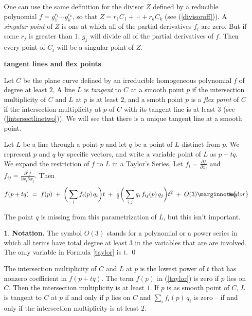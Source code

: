 \documentclass[leqno]{book}
\newcommand\Marginnote[1]{\marginnote{\hspace{-12pt}\normalfont{#1}}}
\renewcommand\theequation{\thesection.\arabic{equation}}
\newenvironment{boldequation}{\renewcommand\theequation{\textbf{\thesection.\arabic{equation}}}\equation}
   {\endequation}
\theoremstyle{definition}%
\numberwithin{equation}{section}
\newtheorem{note}[equation]{}
\theoremstyle{theorem} %
\begin{document}
\ms One can use the same definition for the divisor $Z$ defined by a
reducible polynomial $f=g_1^{r_1}\cdots g_k^{r_k}$, so that $Z=
r_1C_1+\cdots + r_kC_k$ (see (\ref{divisoroff})).  A {\it singular
  point} of $Z$ is one at which all of the partial derivatives $f_i$
are zero.  But if some $r_j$ is
greater than $1$, $g_j$ will divide all of the partial
derivatives of $f$.  Then every point of $C_j$ will be a singular
point of  $Z$.


\begin{boldequation}\Marginnote{tangent} 
\hspace{-8.5cm} \textbf{tangent lines and flex points} 
\label{tangent}\end{boldequation}


\ms Let $C$ be the plane curve defined by an irreducible homogeneous
polynomial $f$ of degree at least $2$, A line $L$ is {\it tangent} to
$C$ at a smooth point $p$ if the intersection multiplicity of $C$ and
$L$ at $p$ is at least $2$, and a smoth point
 $p$ is a {\it flex point} of
$C$ if the intersection multiplicity at $p$ of $C$ with its tangent
line is at least $3$ (see (\ref{intersectlinetwo})).  We will see that
there is a unique tangent line at a smooth point.

\ms Let $L$ be a line through a point $p$ and let $q$ be a point of
$L$ distinct from $p$.  We represent $p$ and $q$ by specific vectors,
and write a variable point of $L$ as $p+tq$.
We  expand the restriction of $f$ to $L$ in a Taylor's Series, 
Let $f_{i}= \frac {\partial f}{\partial x_i} $ and $f_{ij}=
\frac {\partial^2 f}{\partial x_i\partial x_j}$.  Then
\begin{equation}f(p+tq) \;=\; f(p) \; + \;\bigg(\sum_i f_i(p)\,q_i\bigg)t \;+\;
{\textstyle{\frac 1 2 }} \bigg(\sum_{i,j} q_i\,f_{ij}(p)\,q_j\bigg)t^2
\;+\; O(3)  \Marginnote{taylor}	\label{taylor}\end{equation}

\no
 The point $q$ is missing from this
parametrization of $L$, but this isn't important.

\begin{note}{\bf Notation.} \label{Onotation}\Marginnote{Onotation} The
symbol $O(3)$ stands for a polynomial or a power series in which all
terms have total degree at least $3$ in the variables that are are
involved.  The only variable in Formula \ref{taylor} is $t$.
\qed\end{note}

 The intersection multiplicity of $C$ and $L$ at $p$ is the lowest
 power of $t$ that has nonzero coefficient in $f(p+tq)$.  The term
 $f(p)$ in (\ref{taylor}) is zero if $p$ lies on $C$.  Then the
 intersection multiplicity is at least $1$.  If $p$ is as smooth point
 of $C$, $L$ is tangent to $C$ at $p$ if and only if $p$ lies on $C$
 and $\sum_i f_i(p)\,q_i$ is zero -- if and only if the intersection
 multiplicity is at least $2$.
\end{document}
